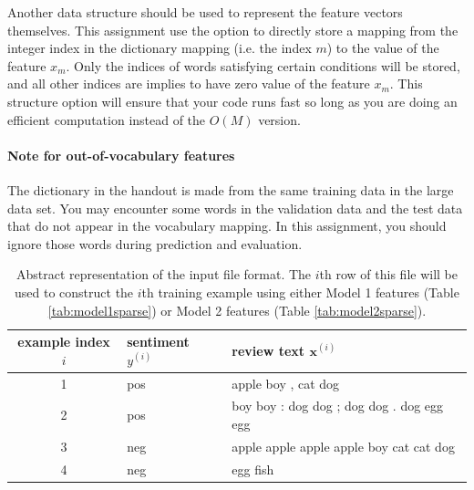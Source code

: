 \documentclass[11pt]{exam}
\numberwithin{equation}{section} %
\numberwithin{figure}{section} %
\numberwithin{table}{section} %
\def\x{\mathbf x}
\begin{document}
Another data structure should be used to represent the feature vectors themselves. This assignment use the option to directly store a mapping from the integer index in the dictionary mapping (i.e. the index $m$) to the value of the feature $x_m$. Only the indices of words satisfying certain conditions will be stored, and all other indices are implies to have zero value of the feature $x_m$. This structure option will ensure that your code runs fast so long as you are doing an efficient computation instead of the $O(M)$ version.

\paragraph{Note for out-of-vocabulary features} The dictionary in the handout is made from the same training data in the large data set. You may encounter some words in the validation data and the test data that do not appear in the vocabulary mapping. In this assignment, you should ignore those words during prediction and evaluation.


\begin{table}[p]
    \centering
%
\begin{tabular}{cll}
\toprule
{\bf example index} $i$  & {\bf sentiment $y^{(i)}$ } & {\bf review text $\x^{(i)}$ }\\
\midrule
1 & pos & apple boy , cat dog \\
2 & pos & boy boy : dog dog ; dog dog . dog egg egg \\
3 & neg & apple apple apple apple boy cat cat dog \\
4 & neg & egg fish \\

\bottomrule
\end{tabular}
%
    \caption{Abstract representation of the input file format.  The $i$th row of this file will be used to construct the $i$th training example using either Model 1 features (Table \ref{tab:model1sparse}) or Model 2 features (Table \ref{tab:model2sparse}).}
    \label{tab:inputfile}
\end{table}
\end{document}
